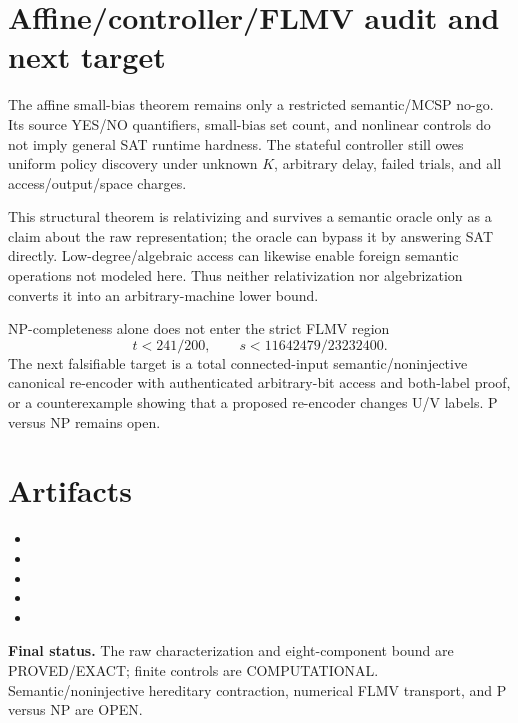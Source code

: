 \documentclass[11pt]{article}
\newcommand{\status}[1]{\textsf{#1}}
\begin{document}
\section{Affine/controller/FLMV audit and next target}
The affine small-bias theorem remains only a restricted semantic/MCSP no-go.  Its source YES/NO quantifiers, small-bias set count, and nonlinear controls do not imply general SAT runtime hardness.  The stateful controller still owes uniform policy discovery under unknown $K$, arbitrary delay, failed trials, and all access/output/space charges.

This structural theorem is relativizing and survives a semantic oracle only as a claim about the raw representation; the oracle can bypass it by answering SAT directly.  Low-degree/algebraic access can likewise enable foreign semantic operations not modeled here.  Thus neither relativization nor algebrization converts it into an arbitrary-machine lower bound.

NP-completeness alone does not enter the strict FLMV region
\[
t<241/200,\qquad s<11642479/23232400.
\]
The next falsifiable target is a total connected-input semantic/noninjective canonical re-encoder with authenticated arbitrary-bit access and both-label proof, or a counterexample showing that a proposed re-encoder changes U/V labels.  P versus NP remains open.

\section{Artifacts}
\begin{itemize}
\item {}
\item {}
\item {}
\item {}
\item {}
\end{itemize}

\noindent\textbf{Final status.}  The raw characterization and eight-component bound are \status{PROVED/EXACT}; finite controls are \status{COMPUTATIONAL}.  Semantic/noninjective hereditary contraction, numerical FLMV transport, and P versus NP are \status{OPEN}.
\end{document}
